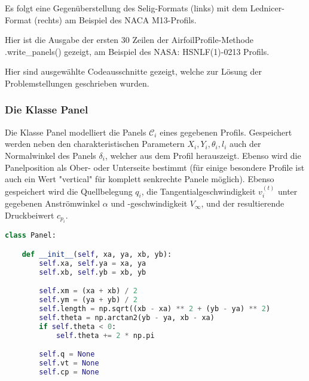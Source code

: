 \appendix

\label{appendix:a}

Es folgt eine Gegenüberstellung des Selig-Formats (links) mit dem Lednicer-Format (rechts) am Beispiel des NACA M13-Profils.

\begin{minipage}{0.45\textwidth}

\end{minipage}
    \hfill
\begin{minipage}{0.45\textwidth}

\end{minipage}

\newpage
{}
\label{appendix:b}
Hier ist die Ausgabe der ersten 30 Zeilen der AirfoilProfile-Methode .write\_panels() gezeigt, am Beispiel des NASA: HSNLF(1)-0213 Profils.



\newpage
{}
\label{appendix:c}
Hier sind ausgewählte Codeausschnitte gezeigt, welche zur Lösung der Problemstellungen geschrieben wurden.
\subsubsection{Die Klasse Panel}
Die Klasse Panel modelliert die Panels $\mathcal{C}_i$ eines gegebenen Profils. Gespeichert werden neben den charakteristischen Parametern $X_i, Y_i, \theta _i, l_i$ auch der Normalwinkel des Panels $\delta_i$, welcher aus dem Profil herauszeigt. Ebenso wird die Panelposition als Ober- oder Unterseite bestimmt (für einige besondere Profile ist auch ein Wert "vertical" für komplett senkrechte Panele möglich). Ebenso gespeichert wird die Quellbelegung $q_i$, die Tangentialgeschwindigkeit $v_i^{(t)}$ unter gegebenen Anströmwinkel $\alpha $ und -geschwindigkeit $V_{\infty}$, und der resultierende Druckbeiwert $c_{p_i}$.
\begin{lstlisting}[language=Python]
class Panel:

    def __init__(self, xa, ya, xb, yb):
        self.xa, self.ya = xa, ya
        self.xb, self.yb = xb, yb

        self.xm = (xa + xb) / 2
        self.ym = (ya + yb) / 2
        self.length = np.sqrt((xb - xa) ** 2 + (yb - ya) ** 2)
        self.theta = np.arctan2(yb - ya, xb - xa)
        if self.theta < 0:
            self.theta += 2 * np.pi

        self.q = None
        self.vt = None
        self.cp = None
\end{lstlisting}


